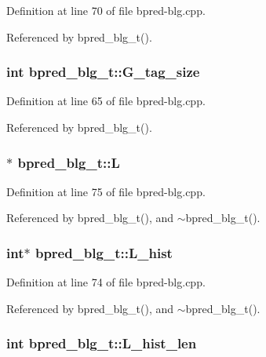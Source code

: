 Definition at line 70 of file bpred-blg.cpp.

Referenced by bpred\_\-blg\_\-t().
\subsubsection[{G\_\-tag\_\-size}]{\setlength{\rightskip}{0pt plus 5cm}int {\bf bpred\_\-blg\_\-t::G\_\-tag\_\-size}\hspace{0.3cm}{\tt  [protected]}}\label{classbpred__blg__t_ec5c06f6d58257b6b1b4f38abe610491}




Definition at line 65 of file bpred-blg.cpp.

Referenced by bpred\_\-blg\_\-t().
\subsubsection[{L}]{$\ast$ {\bf bpred\_\-blg\_\-t::L}\hspace{0.3cm}{\tt  [protected]}}\label{classbpred__blg__t_3bc9c0dee7e302b20681b63621ddda1e}




Definition at line 75 of file bpred-blg.cpp.

Referenced by bpred\_\-blg\_\-t(), and $\sim$bpred\_\-blg\_\-t().
\subsubsection[{L\_\-hist}]{\setlength{\rightskip}{0pt plus 5cm}int$\ast$ {\bf bpred\_\-blg\_\-t::L\_\-hist}\hspace{0.3cm}{\tt  [protected]}}\label{classbpred__blg__t_b493491e7e3688b596f5c5e49f181c49}




Definition at line 74 of file bpred-blg.cpp.

Referenced by bpred\_\-blg\_\-t(), and $\sim$bpred\_\-blg\_\-t().
\subsubsection[{L\_\-hist\_\-len}]{\setlength{\rightskip}{0pt plus 5cm}int {\bf bpred\_\-blg\_\-t::L\_\-hist\_\-len}\hspace{0.3cm}{\tt  [protected]}}\label{classbpred__blg__t_73d2caa30f1f7053a6f627054a5bf876}




